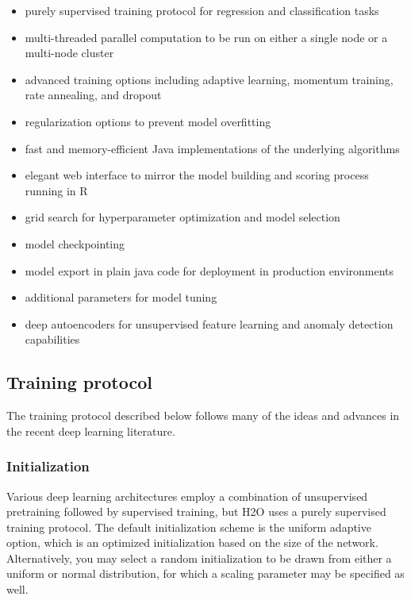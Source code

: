 \documentclass[11pt]{article}
\begin{document}
\begin{itemize}

\item purely supervised training protocol for regression and classification tasks

\item multi-threaded parallel computation to be run on either a single node or a multi-node cluster

\item advanced training options including adaptive learning, momentum training, rate annealing, and dropout

\item regularization options to prevent model overfitting

\item fast and memory-efficient Java implementations of the underlying algorithms

\item elegant web interface to mirror the model building and scoring process running in R

\item grid search for hyperparameter optimization and model selection

\item model checkpointing

\item model export in plain java code for deployment in production environments

\item additional parameters for model tuning

\item deep autoencoders for unsupervised feature learning and anomaly detection capabilities

\end{itemize}


\subsection{Training protocol} \label{2.2}
The training protocol described below follows many of the ideas and advances in the recent deep learning literature.

\subsubsection{Initialization} \label{2.2.1}
\noindent
Various deep learning architectures employ a combination of unsupervised pretraining followed by supervised training, but H2O uses a purely supervised training protocol. The default initialization scheme is the uniform adaptive option, which is an optimized initialization based on the size of the network. Alternatively, you may select a random initialization to be drawn from either a uniform or normal distribution, for which a scaling parameter may be specified as well.
\end{document}
